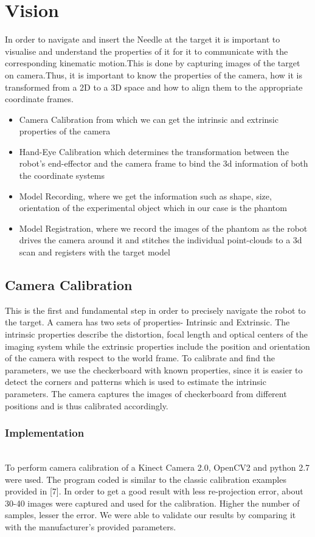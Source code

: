 \section{Vision}
In order to navigate and insert the Needle at the target it is important to visualise and understand the properties of it for it to communicate with the corresponding kinematic motion.This is done by capturing images of the target on camera.Thus, it is important to know the properties of the camera, how it is transformed from a 2D to a 3D space and how to align them to the appropriate coordinate frames.

\begin{itemize}
    \item Camera Calibration from which we can get the intrinsic and extrinsic properties of the camera
    \item Hand-Eye Calibration which determines the transformation between the robot's end-effector and the camera frame to bind the 3d information of both the coordinate systems
    \item Model Recording, where we get the information such as shape, size, orientation of the experimental object which in our case is the phantom
    \item Model Registration, where we record the images of the phantom as the robot drives the camera around it and stitches the individual point-clouds to a 3d scan and registers with the target model
\end{itemize}

\subsection{Camera Calibration}
This is the first and fundamental step in order to precisely navigate the robot to the target. A camera has two sets of properties- Intrinsic and Extrinsic. The intrinsic properties describe the distortion, focal length and optical centers of the imaging system while the extrinsic properties include the position and orientation of the camera with respect to the world frame. To calibrate and find the parameters, we use the checkerboard with known properties, since it is easier to detect the corners and patterns which is used to estimate the intrinsic parameters. The camera captures the images of checkerboard from different positions and is thus calibrated accordingly.

\subsubsection{Implementation}~\\
To perform camera calibration of a Kinect Camera 2.0, OpenCV2  and python 2.7 were used. The program coded is similar to the classic calibration examples provided in [7]. In order to get a good result with less re-projection error, about 30-40 images were captured and used for the calibration. Higher the number of samples, lesser the error. We were able to validate our results by comparing it with the manufacturer's provided parameters.

